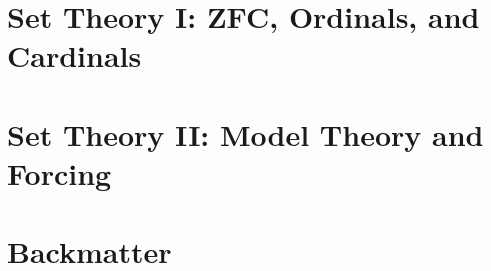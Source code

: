 \documentclass[11pt,twoside=semi,openright,numbers=noenddot]{scrbook}
\begin{document}
\part{Set Theory I: ZFC, Ordinals, and Cardinals}
\parttoc





\part{Set Theory II: Model Theory and Forcing}
\parttoc




\part{Backmatter}
\parttoc
\appendix







\backmatter

\clearpage
\printbibliography[type=image,title={Image Attributions}]
\printbibliography[nottype=image]
\end{document}
